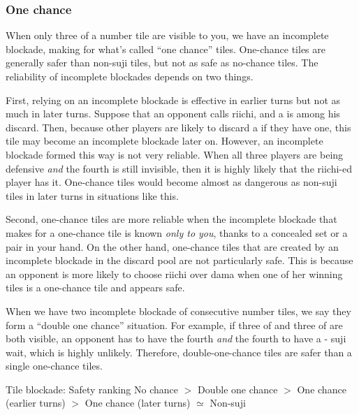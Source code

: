 {{\subsubsection*{One chance}

When only three of a number tile are visible to you, we have an incomplete blockade, making for what's called ``one chance'' tiles. One-chance tiles are generally safer than non-{\jap suji} tiles, but not as safe as no-chance tiles. 
The reliability of incomplete blockades depends on two things. 

\bigskip
First, relying on an incomplete blockade is effective in earlier turns but not as much in later turns. Suppose that an opponent calls {\jap riichi}, and a {\large{}} is among his discard. Then, because other players are likely to discard a {\large{}} if they have one, this tile may become an incomplete blockade later on. However, an incomplete blockade formed this way is not very reliable. When all three players are being defensive \emph{and} the fourth {\large{}} is still invisible, then it is highly likely that the {\jap riichi}-ed player has it. One-chance tiles would become almost as dangerous as non-{\jap suji} tiles in later turns in situations like this. 

\bigskip
Second, one-chance tiles are more reliable when the incomplete blockade that makes for a one-chance tile is known \emph{only to you}, thanks to a concealed set or a pair in your hand. On the other hand, one-chance tiles that are created by an incomplete blockade in the discard pool are not particularly safe. This is because an opponent is more likely to choose {\jap riichi} over {\jap dama} when one of her winning tiles is a one-chance tile and appears safe.

\bigskip

When we have two incomplete blockade of consecutive number tiles, we say they form a ``double one chance'' situation. For example, if three of {\large{}} and three of {\large{}} are both visible, an opponent has to have the fourth {\large{}} \emph{and} the fourth {\large{}} to have a {\large{}-} {\jap suji} wait, which is highly unlikely. Therefore, double-one-chance tiles are safer than a single one-chance tiles. 

\bigskip
\begin{itembox}[c]{Tile blockade: Safety ranking}
No chance $>$ Double one chance $>$ One chance (earlier turns) $>$ One chance (later turns) $\simeq$ Non-{\jap suji}
\vsps
\end{itembox}
\bigskip

}}
